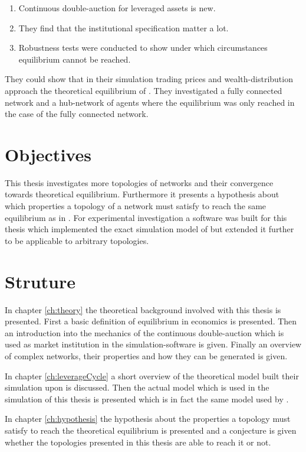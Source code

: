 \documentclass[Bachelorarbeit.tex]{subfiles}
\begin{document}
\begin{enumerate}
\item Continuous double-auction for leveraged assets is new.
\item They find that the institutional specification matter a lot.
\item Robustness tests were conducted to show under which circumstances equilibrium cannot be reached.
\end{enumerate}

They could show that in their simulation trading prices and wealth-distribution approach the theoretical equilibrium of \cite{Geanakoplos2009}. They investigated a fully connected network and a hub-network of agents where the equilibrium was only reached in the case of the fully connected network. 

\section{Objectives}
This thesis investigates more topologies of networks and their convergence towards theoretical equilibrium. Furthermore it presents a hypothesis about which properties a topology of a network must satisfy to reach the same equilibrium as in \cite{Breuer2015}. For experimental investigation a software was built for this thesis which implemented the exact simulation model of \cite{Breuer2015} but extended it further to be applicable to arbitrary topologies.

\section{Struture}
In chapter \ref{ch:theory} the theoretical background involved with this thesis is presented. First a basic definition of equilibrium in economics is presented. Then an introduction into the mechanics of the continuous double-auction which is used as market institution in the simulation-software is given. Finally an overview of complex networks, their properties and how they can be generated is given.

\bigskip

In chapter \ref{ch:leverageCycle} a short overview of the theoretical model \cite{Breuer2015} built their simulation upon is discussed. Then the actual model which is used in the simulation of this thesis is presented which is in fact the same model used by \cite{Breuer2015}.

\bigskip

In chapter \ref{ch:hypothesis} the hypothesis about the properties a topology must satisfy to reach the theoretical equilibrium is presented and a conjecture is given whether the topologies presented in this thesis are able to reach it or not.
\end{document}
